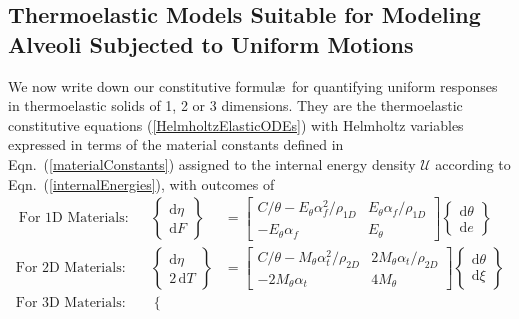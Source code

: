 \subsection{Thermoelastic Models Suitable for Modeling Alveoli Subjected to Uniform Motions}

We now write down our constitutive formul\ae\ for quantifying uniform responses in thermo\-elastic solids of 1, 2 or 3 dimensions.  They are the thermo\-elastic constitutive equations (\ref{HelmholtzElasticODEs}) with Helmholtz variables expressed in terms of the material constants defined in Eqn.~(\ref{materialConstants}) assigned to the internal energy density $\mathcal{U}$ according to Eqn.~(\ref{internalEnergies}), with outcomes of
\begin{subequations}
    \label{HelmholtzCEs}
    \begin{align}\
    \text{For 1D Materials:} & &
    \left\{ \begin{matrix}
    \mathrm{d} \eta \\ \mathrm{d} F
    \end{matrix} \right\} & = \begin{bmatrix}
    C / \theta - E_{\theta} \alpha_f^2 / \rho_{1D}& 
    E_{\theta} \alpha_f / \rho_{1D} \\
    -E_{\theta} \alpha_f & E_{\theta}
    \end{bmatrix} \left\{ \begin{matrix}
    \mathrm{d} \theta \\ \mathrm{d} e
    \end{matrix} \right\} \label{Helmholtz1D} \\
    \text{For 2D Materials:} & &
    \left\{ \begin{matrix}
    \mathrm{d} \eta \\ 2 \, \mathrm{d} T
    \end{matrix} \right\} & = \begin{bmatrix}
    C / \theta - M_{\theta} \alpha_t^2 / \rho_{2D} & 
    2 M_{\theta} \alpha_t / \rho_{2D} \\
    -2 M_{\theta} \alpha_t & 4 M_{\theta}
    \end{bmatrix} \left\{ \begin{matrix}
    \mathrm{d} \theta \\ \mathrm{d} \xi
    \end{matrix} \right\} \label{Helmholtz2D} \\
    \text{For 3D Materials:} & &
    \left\{ \begin{matrix}

\end{matrix}
\end{align}
\end{subequations}
